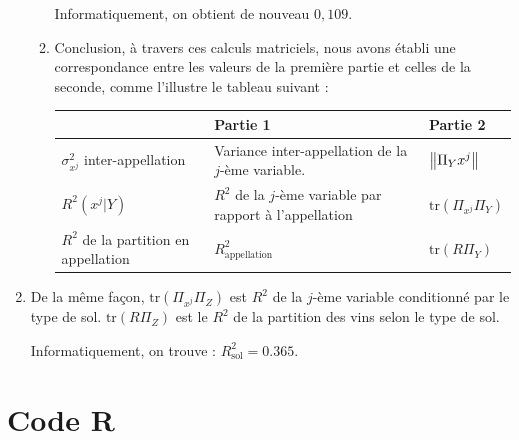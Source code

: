 \documentclass{article}
\begin{document}
\begin{enumerate}
\begin{enumerate}
	Informatiquement, on obtient de nouveau $0,109$.
	
	\item Conclusion, à travers ces calculs matriciels, nous avons établi une correspondance entre les valeurs de la première partie et celles de la seconde, comme l'illustre le tableau suivant : 
	
	\begin{center}
	\begin{tabular}{|m{3cm}|>{\centering\arraybackslash}m{5cm}|>{\centering\arraybackslash}m{5cm}|}
	\hline 
	 & Partie 1 & Partie 2 \\ 
	\hline 
$\sigma_{x^j}^2$ inter-appellation	 & Variance inter-appellation de la $j$-ème variable. & $\left\|  \Pi_Y x^j\right\|$ \\ 
	\hline 
	$R^2(x^j|Y)$ & $R^2$ de la $j$-ème variable par rapport à l'appellation  & $\text{tr}(\Pi_{x^j}\Pi_{Y})$ \\ 
	\hline 
	$R^2$ de la partition en appellation & $R^2_{\text{appellation}}$ & $\text{tr}(R\Pi_Y)$ \\ 
	\hline 
	\end{tabular} 
	\end{center}
	\end{enumerate}
	

\item De la même façon, $\text{tr}(\Pi_{x^j}\Pi_{Z})$ est $R^2$ de la $j$-ème variable conditionné par le type de sol. $\text{tr}(R\Pi_{Z})$ est le $R^2$ de la partition des vins selon le type de sol.

Informatiquement, on trouve : $R^2_{\text{sol}}=0.365$.
\end{enumerate}

\newpage

\appendix 

\section{Code R}
\end{document}
